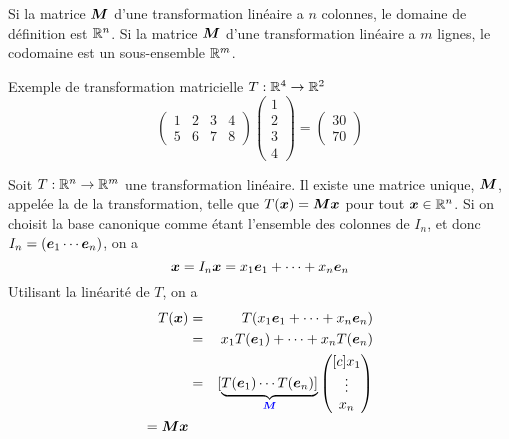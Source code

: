 Si la matrice $\boldsymbol{M}$ d'une transformation linéaire a $n$ colonnes, le domaine de définition est $\mathbb{R}^n$.
Si la matrice $\boldsymbol{M}$ d'une transformation linéaire a $m$ lignes, le codomaine est un sous-ensemble $\mathbb{R}^m$.

\begin{exemple}
Exemple de transformation matricielle $T: \mathbb{R}^4 \rightarrow\mathbb{R}^2$
\[
\begin{pmatrix}
1 & 2 & 3 & 4 \\
5 & 6 & 7 & 8
\end{pmatrix}
\begin{pmatrix}
1 \\ 2 \\ 3 \\ 4
\end{pmatrix}
=
\begin{pmatrix}
30 \\
70
\end{pmatrix}
\]
\end{exemple}

\begin{theo}
Soit $T: \mathbb{R}^n \rightarrow\mathbb{R}^m$ une transformation linéaire.  Il existe une
matrice unique, $\boldsymbol{M}$, appelée la  de la transformation, 
telle que $T(\boldsymbol{x}) = \boldsymbol{M}\boldsymbol{x}$ pour tout $\boldsymbol{x}\in\mathbb{R}^n$.
\proof
Si on choisit la base canonique comme étant l'ensemble des colonnes de $I_n$, et donc
$I_n = ( \boldsymbol{e}_1 \cdots \boldsymbol{e}_n)$, on a
\[
\boldsymbol{x} = I_n\boldsymbol{x} = x_1\boldsymbol{e}_1 + \cdots + x_n \boldsymbol{e}_n
\]
Utilisant la linéarité de $T$, on a
\begin{eqnarray*}
T(\boldsymbol{x}) &=& T( x_1\boldsymbol{e}_1 + \cdots + x_n \boldsymbol{e}_n ) \\
  &=& x_1T(\boldsymbol{e}_1) + \cdots + x_nT(\boldsymbol{e}_n) \\
  &=& \displaystyle [\underbrace{T(\boldsymbol{e}_1) \cdots T(\boldsymbol{e}_n)]}_{\color{blue}\boldsymbol{M}} \begin{pmatrix}[c]
  x_1 \\
  \vdots\\
  x_n
  \end{pmatrix}\\
  = \boldsymbol{M}\boldsymbol{x}
\end{eqnarray*}
\end{theo}


